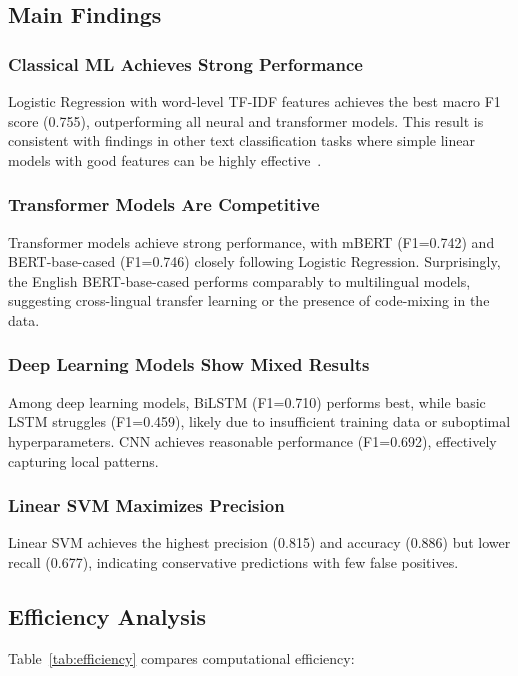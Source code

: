 \documentclass[conference]{IEEEtran}
\begin{document}
\subsection{Main Findings}

\subsubsection{Classical ML Achieves Strong Performance}
Logistic Regression with word-level TF-IDF features achieves the best macro F1 score (0.755), outperforming all neural and transformer models. This result is consistent with findings in other text classification tasks where simple linear models with good features can be highly effective~\cite{wang2012baselines}.

\subsubsection{Transformer Models Are Competitive}
Transformer models achieve strong performance, with mBERT (F1=0.742) and BERT-base-cased (F1=0.746) closely following Logistic Regression. Surprisingly, the English BERT-base-cased performs comparably to multilingual models, suggesting cross-lingual transfer learning or the presence of code-mixing in the data.

\subsubsection{Deep Learning Models Show Mixed Results}
Among deep learning models, BiLSTM (F1=0.710) performs best, while basic LSTM struggles (F1=0.459), likely due to insufficient training data or suboptimal hyperparameters. CNN achieves reasonable performance (F1=0.692), effectively capturing local patterns.

\subsubsection{Linear SVM Maximizes Precision}
Linear SVM achieves the highest precision (0.815) and accuracy (0.886) but lower recall (0.677), indicating conservative predictions with few false positives.

\subsection{Efficiency Analysis}

Table~\ref{tab:efficiency} compares computational efficiency:
\end{document}
